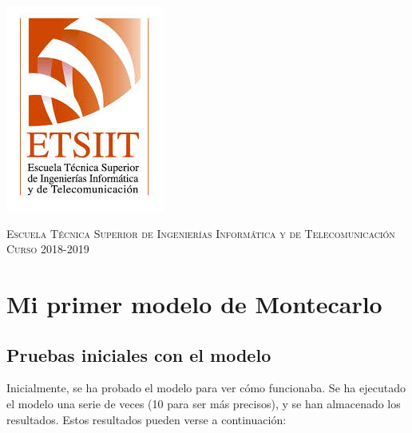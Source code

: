 \documentclass[11pt,a4paper]{report}
\begin{document}
\begin{titlepage}
\begin{minipage}{\textwidth}
\includegraphics[scale=0.3]{img/etsiit.jpeg}

\vspace{0.7cm}
\textsc{Escuela Técnica Superior de Ingenierías Informática y de Telecomunicación}\\
\vspace{1cm}
\textsc{Curso 2018-2019}
\end{minipage}
\end{titlepage}

\tableofcontents
\thispagestyle{empty}				%

\newpage

\setlength{\parskip}{1em}

\chapter{Mi primer modelo de Montecarlo}

\section{Pruebas iniciales con el modelo}

Inicialmente, se ha probado el modelo para ver cómo funcionaba. Se ha ejecutado el modelo una serie de
veces (10 para ser más precisos), y se han almacenado los resultados. Estos resultados pueden verse a
continuación:
\end{document}

